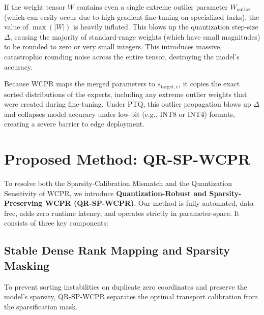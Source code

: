\documentclass{article}
\theoremstyle{plain}
\theoremstyle{definition}
\theoremstyle{remark}
\begin{document}
If the weight tensor $W$ contains even a single extreme outlier parameter $W_{\text{outlier}}$ (which can easily occur due to high-gradient fine-tuning on specialized tasks), the value of $\max(|W|)$ is heavily inflated. This blows up the quantization step-size $\Delta$, causing the majority of standard-range weights (which have small magnitudes) to be rounded to zero or very small integers. This introduces massive, catastrophic rounding noise across the entire tensor, destroying the model's accuracy.

Because WCPR maps the merged parameters to $s_{\text{target},c}$, it copies the exact sorted distributions of the experts, including any extreme outlier weights that were created during fine-tuning. Under PTQ, this outlier propagation blows up $\Delta$ and collapses model accuracy under low-bit (e.g., INT8 or INT4) formats, creating a severe barrier to edge deployment.

\section{Proposed Method: QR-SP-WCPR}
\label{sec:method}
To resolve both the Sparsity-Calibration Mismatch and the Quantization Sensitivity of WCPR, we introduce \textbf{Quantization-Robust and Sparsity-Preserving WCPR (QR-SP-WCPR)}. Our method is fully automated, data-free, adds zero runtime latency, and operates strictly in parameter-space. It consists of three key components:

\subsection{Stable Dense Rank Mapping and Sparsity Masking}
To prevent sorting instabilities on duplicate zero coordinates and preserve the model's sparsity, QR-SP-WCPR separates the optimal transport calibration from the sparsification mask. 
\end{document}

